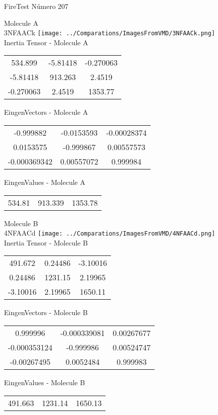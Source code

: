 \vtab[-2cm]
\begin{center}
{\large FireTest \tab Número 207}
\end{center}
\begin{multicols}{2}
\begin{center}

Molecule A \\ 
3NFAACk
\texttt{[image: ../Comparations/ImagesFromVMD/3NFAACk.png]}
\\
Inertia Tensor - Molecule A \\
\vtab

\begin{tabular}{|c c c|}
534.899	 & 	-5.81418	 & 	-0.270063	 \\
-5.81418	 & 	913.263	 & 	2.4519	 \\
-0.270063	 & 	2.4519	 & 	1353.77
\end{tabular}

\vtab
 EingenVectors - Molecule A     \\
\vtab
\begin{tabular}{|c c c|}
-0.999882	 & 	-0.0153593	 & 	-0.00028374	 \\
0.0153575	 & 	-0.999867	 & 	0.00557573	 \\
-0.000369342	 & 	0.00557072	 & 	0.999984
\end{tabular}

\vtab
 EingenValues - Molecule A     \\
\vtab
\begin{tabular}{|c c c|}
534.81	 & 	913.339	 & 	1353.78	 \\
\end{tabular}
\columnbreak

Molecule B \\ 
4NFAACd
\texttt{[image: ../Comparations/ImagesFromVMD/4NFAACd.png]}
\\
Inertia Tensor - Molecule B \\
\vtab

\begin{tabular}{|c c c|}
491.672	 & 	0.24486	 & 	-3.10016	 \\
0.24486	 & 	1231.15	 & 	2.19965	 \\
-3.10016	 & 	2.19965	 & 	1650.11
\end{tabular}

\vtab
 EingenVectors - Molecule B     \\
\vtab
\begin{tabular}{|c c c|}
0.999996	 & 	-0.000339081	 & 	0.00267677	 \\
-0.000353124	 & 	-0.999986	 & 	0.00524747	 \\
-0.00267495	 & 	0.0052484	 & 	0.999983
\end{tabular}

\vtab
 EingenValues - Molecule B     \\
\vtab
\begin{tabular}{|c c c|}
491.663	 & 	1231.14	 & 	1650.13	 \\
\end{tabular}

\end{center}
\end{multicols}
